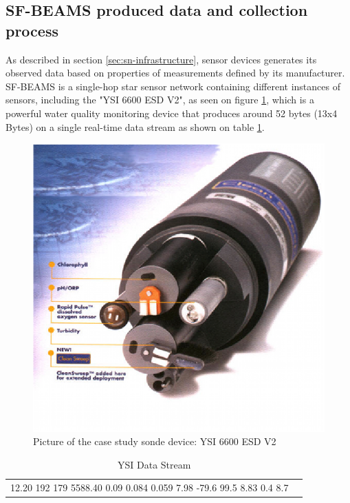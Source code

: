 \subsection{SF-BEAMS produced data and collection process}
\label{sec:sfbeams}

As described in section \ref{sec:sn-infrastructure}, sensor devices generates
its observed data based on properties of measurements defined by its
manufacturer. SF-BEAMS is a single-hop star sensor network containing
different instances of sensors, including the "YSI 6600 ESD V2", as seen on
figure \ref{fig:ysi-device}, which is a powerful water quality monitoring
device that produces around 52 bytes (13x4 Bytes) on a single real-time data
stream as shown on table \ref{tab:ysi-data-stream}.

\begin{figure}
  \centering
  \includegraphics{../diagrams/ysi-device}
  \caption{Picture of the case study sonde device: YSI 6600 ESD V2}
  \label{fig:ysi-device}
\end{figure}

\begin{table}
    \caption{YSI Data Stream}
    \begin{center}
        \begin{tabular}{lr}
  12.20    192    179 5588.40   0.09   0.084   0.059  7.98   -79.6   99.5  8.83 
  0.4     8.7
        \end{tabular}
    \end{center}
    \label{tab:ysi-data-stream}
\end{table}

